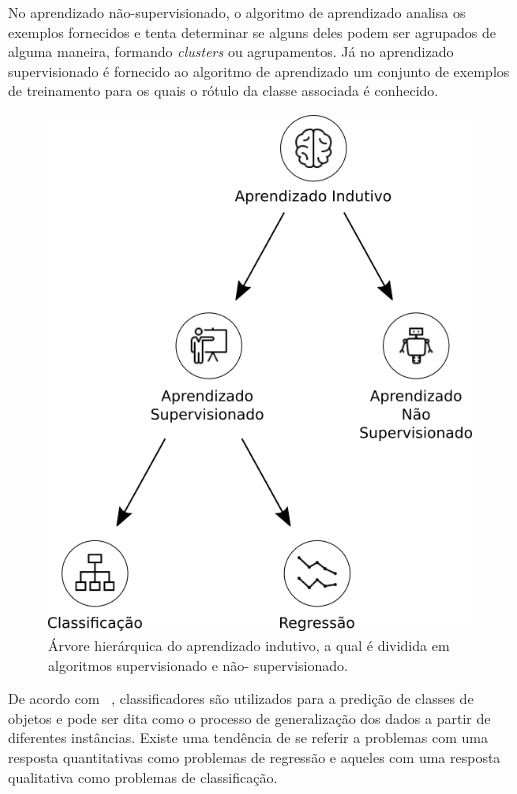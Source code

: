 No aprendizado não-supervisionado, o algoritmo de aprendizado analisa os exemplos fornecidos e tenta determinar se alguns deles podem ser agrupados de alguma maneira, formando \textit{clusters} ou agrupamentos. Já no aprendizado supervisionado é fornecido ao algoritmo de aprendizado um conjunto de exemplos de treinamento para os quais o rótulo da classe associada é conhecido.

\begin{figure}[H]
\begin{center}
    \includegraphics[scale=0.75]{figuras/aprendizado_indutivo.png}
\end{center}
\caption{Árvore hierárquica do aprendizado indutivo, a qual é dividida em algoritmos supervisionado e não- supervisionado.}
\label{fig:aprendizado_indutivo}
\end{figure}

De acordo com ~\cite{porthos_motta:2016}, classificadores são utilizados para a predição de classes de objetos e pode ser dita como o processo de generalização dos dados a partir de diferentes instâncias. Existe uma tendência de se referir a problemas com uma resposta quantitativas como problemas de regressão e aqueles com uma resposta qualitativa como problemas de classificação.

